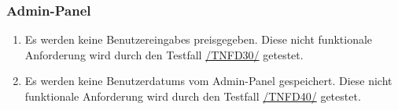 \subsubsection*{Admin-Panel}

\begin{samepage}
    \begin{enumerate}[label=\textbf{/NFD\arabic*0/}, align=left, start=3]
        \item \label{/NFD30/} Es werden keine \Glspl{Benutzereingabe} preisgegeben. Diese nicht funktionale Anforderung wird durch den Testfall \hyperref[/TNFD30/]{/TNFD30/} getestet.
        \item \label{/NFD40/} Es werden keine \Glspl{Benutzerdatum} vom \Gls{Admin-Panel} gespeichert. Diese nicht funktionale Anforderung wird durch den Testfall \hyperref[/TNFD40/]{/TNFD40/} getestet.
    \end{enumerate}
\end{samepage}
